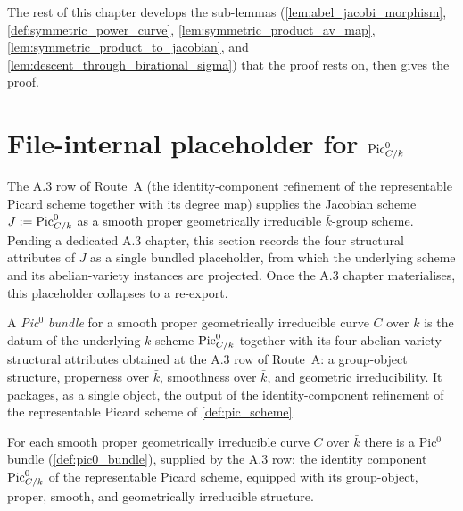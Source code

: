 The rest of this chapter develops the sub-lemmas
(\cref{lem:abel_jacobi_morphism}, \cref{def:symmetric_power_curve},
\cref{lem:symmetric_product_av_map}, \cref{lem:symmetric_product_to_jacobian},
and \cref{lem:descent_through_birational_sigma}) that the proof rests on,
then gives the proof.

\section{File-internal placeholder for \(\operatorname{Pic}^0_{C/k}\)}
\label{sec:albaneseup_pic0_placeholder}

The A.3 row of Route~A (the identity-component refinement of the representable
Picard scheme together with its degree map) supplies the Jacobian scheme
\(J := \operatorname{Pic}^0_{C/k}\) as a smooth proper geometrically irreducible
\(\bar k\)-group scheme. Pending a dedicated A.3 chapter, this section records
the four structural attributes of \(J\) as a single bundled placeholder, from
which the underlying scheme and its abelian-variety instances are projected.
Once the A.3 chapter materialises, this placeholder collapses to a re-export.

\begin{definition}
  \label{def:pic0_bundle}

  A \emph{Pic\(^0\) bundle} for a smooth proper geometrically irreducible
  curve \(C\) over \(\bar k\) is the datum of the underlying \(\bar k\)-scheme
  \(\operatorname{Pic}^0_{C/k}\) together with its four abelian-variety structural
  attributes obtained at the A.3 row of Route~A: a group-object structure,
  properness over \(\bar k\), smoothness over \(\bar k\), and geometric
  irreducibility. It packages, as a single object, the output of the
  identity-component refinement of the representable Picard scheme of
  \cref{def:pic_scheme}.
\end{definition}

\begin{definition}
  \label{def:pic0_bundle_carrier}

  For each smooth proper geometrically irreducible curve \(C\) over \(\bar k\)
  there is a Pic\(^0\) bundle (\cref{def:pic0_bundle}), supplied by the A.3
  row: the identity component \(\operatorname{Pic}^0_{C/k}\) of the representable Picard
  scheme, equipped with its group-object, proper, smooth, and geometrically
  irreducible structure.
\end{definition}

